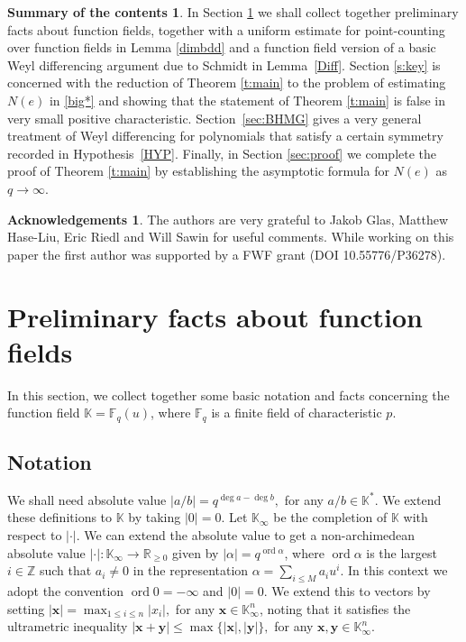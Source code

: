 \documentclass[12pt, reqno]{amsart}
\numberwithin{equation}{section}
\newcommand{\0}{\mathbf{0}}
\newcommand{\FF}{\mathbb{F}}
\newcommand{\ZZ}{\mathbb{Z}}
\newcommand{\RR}{\mathbb{R}}
\newcommand{\KK}{\mathbb{K}}
\renewcommand{\leq}{\leqslant}
\renewcommand{\geq}{\geqslant}
\newcommand{\x}{\mathbf{x}}
\newcommand{\y}{\mathbf{y}}
\renewcommand{\=}{\equiv}
\newcommand{\1}{\mathbf{1}}
\theoremstyle{definition}
\newtheorem*{ack}{Acknowledgements}
\newtheorem*{summary}{Summary of the contents}
\DeclareMathOperator{\ord}{ord}
\begin{document}
\begin{summary}
In Section \ref{s:prem} we shall collect together preliminary facts about function fields, together 
with a uniform estimate for point-counting over function fields in Lemma \ref{dimbdd} and 
a function field version of a basic Weyl differencing argument due to Schmidt in Lemma~\ref{Diff}. 
 Section \ref{s:key} is concerned with the reduction of Theorem \ref{t:main} to the problem of 
 estimating $N(e)$ in \eqref{big*}
and showing that the statement of  Theorem \ref{t:main} is false in very small positive characteristic.
   Section~\ref{sec:BHMG} gives a very general treatment of Weyl differencing for  
polynomials that satisfy a certain symmetry recorded in Hypothesis~\ref{HYP}. Finally, in Section \ref{sec:proof} we complete the proof of Theorem \ref{t:main} by establishing the asymptotic formula for $N(e)$ as $q\to \infty$.
\end{summary}

\begin{ack}
The authors are very grateful to Jakob Glas, Matthew Hase-Liu,  Eric Riedl and Will Sawin for useful comments.
While working on this paper the  first author was supported  by
a FWF grant (DOI 10.55776/P36278).
\end{ack}






\section{Preliminary facts about function fields}
\label{s:prem}
In this section,  we collect together some basic notation and facts concerning the function field $\KK = \FF_q(u)$, where $\FF_q$ is a finite field of characteristic $p$.


\subsection*{Notation}
We shall need  absolute value
$
|a/b|=
q^{\deg a-\deg b},
$
for any $a/b\in \KK^*$. We extend these definitions to  $\KK$ by taking $|0|=0.$
Let  $\KK_\infty$ be  the completion of $\KK$  with respect to $|\cdot|$.
We can extend the absolute value to get  a non-archimedean
absolute value
$|\cdot|: \KK_\infty\rightarrow \RR_{\geq 0}$
given by $|\alpha|=q^{\ord \alpha}$, where $\ord \alpha$ is the largest $i\in
\ZZ$ such that $a_i\neq 0$ in the
representation $\alpha=\sum_{i\leq M}a_i u^i$.
In this context we adopt the convention $\ord 0=-\infty$ and $|0|=0$.
We extend this to vectors by setting
$
|\x|=\max_{1\leq i\leq n}|x_i|,
$
for any $\x\in \KK_\infty^n$, noting that it satisfies  the ultrametric inequality
$
|\x + \y| \leq \max \{ |\x|, |\y| \},
$
for any $\x, \y \in \KK_\infty^n$.
\end{document}
